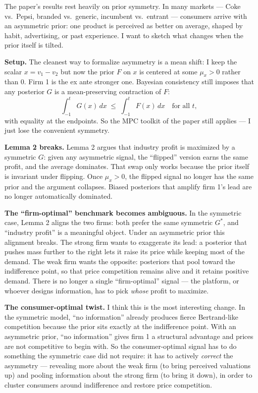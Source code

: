 \documentclass[12pt, a4paper]{article}
\begin{document}
The paper's results rest heavily on prior symmetry. In many markets --- Coke vs.\ Pepsi, branded vs.\ generic, incumbent vs.\ entrant --- consumers arrive with an asymmetric prior: one product is perceived as better on average, shaped by habit, advertising, or past experience. I want to sketch what changes when the prior itself is tilted.

\textbf{Setup.} The cleanest way to formalize asymmetry is a mean shift: I keep the scalar $x = v_1 - v_2$ but now the prior $F$ on $x$ is centered at some $\mu_x > 0$ rather than $0$. Firm 1 is the ex ante stronger one. Bayesian consistency still imposes that any posterior $G$ is a mean-preserving contraction of $F$:
\[
\int_{-1}^{t} G(x)\,dx \;\le\; \int_{-1}^{t} F(x)\,dx \quad \text{for all } t,
\]
with equality at the endpoints. So the MPC toolkit of the paper still applies --- I just lose the convenient symmetry.

\textbf{Lemma 2 breaks.} Lemma 2 argues that industry profit is maximized by a symmetric $G$: given any asymmetric signal, the ``flipped'' version earns the same profit, and the average dominates. That swap only works because the prior itself is invariant under flipping. Once $\mu_x > 0$, the flipped signal no longer has the same prior and the argument collapses. Biased posteriors that amplify firm 1's lead are no longer automatically dominated.

\textbf{The ``firm-optimal'' benchmark becomes ambiguous.} In the symmetric case, Lemma 2 aligns the two firms: both prefer the same symmetric $G^*$, and ``industry profit'' is a meaningful object. Under an asymmetric prior this alignment breaks. The strong firm wants to exaggerate its lead: a posterior that pushes mass further to the right lets it raise its price while keeping most of the demand. The weak firm wants the opposite: posteriors that pool toward the indifference point, so that price competition remains alive and it retains positive demand. There is no longer a single ``firm-optimal'' signal --- the platform, or whoever designs information, has to pick \emph{whose} profit to maximize.

\textbf{The consumer-optimal twist.} I think this is the most interesting change. In the symmetric model, ``no information'' already produces fierce Bertrand-like competition because the prior sits exactly at the indifference point. With an asymmetric prior, ``no information'' gives firm 1 a structural advantage and prices are not competitive to begin with. So the consumer-optimal signal has to do something the symmetric case did not require: it has to actively \emph{correct} the asymmetry --- revealing more about the weak firm (to bring perceived valuations up) and pooling information about the strong firm (to bring it down), in order to cluster consumers around indifference and restore price competition.
\end{document}
